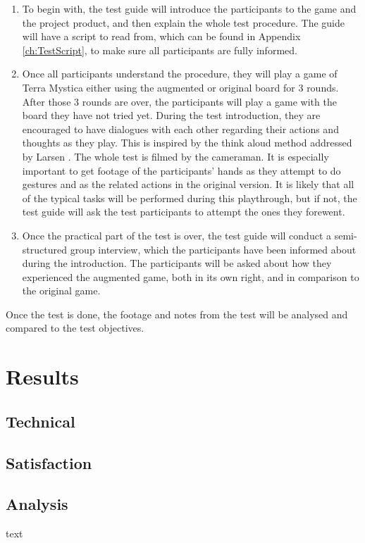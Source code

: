 \begin{enumerate}
\item To begin with, the test guide will introduce the participants to the game and the project product, and then explain the whole test procedure. The guide will have a script to read from, which can be found in Appendix \ref{ch:TestScript}, to make sure all participants are fully informed.
\item Once all participants understand the procedure, they will play a game of Terra Mystica either using the augmented or original board for 3 rounds. After those 3 rounds are over, the participants will play a game with the board they have not tried yet.  During the test introduction, they are encouraged to have dialogues with each other regarding their actions and thoughts as they play. This is inspired by the think aloud method addressed by Larsen \citep{TestingLecture}. The whole test is filmed by the cameraman. It is especially important to get footage of the participants' hands as they attempt to do gestures and as the related actions in the original version. It is likely that all of the typical tasks will be performed during this playthrough, but if not, the test guide will ask the test participants to attempt the ones they forewent.
\item Once the practical part of the test is over, the test guide will conduct a semi-structured group interview, which the participants have been informed about during the introduction. The participants will be asked about how they experienced the augmented game, both in its own right, and in comparison to the original game.
\end{enumerate}

Once the test is done, the footage and notes from the test will be analysed and compared to the test objectives.

\section{Results}
\subsection{Technical}
\subsection{Satisfaction}
\subsection{Analysis}
text